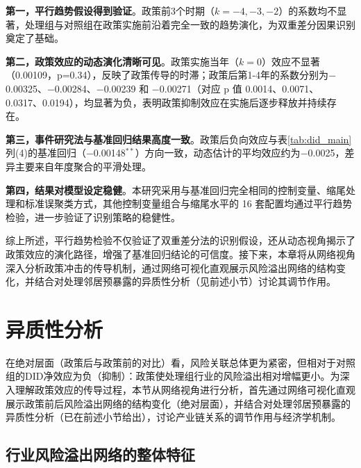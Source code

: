 \textbf{第一，平行趋势假设得到验证}。政策前3个时期（$k=-4,-3,-2$）的系数均不显著，处理组与对照组在政策实施前沿着完全一致的趋势演化，为双重差分因果识别奠定了基础。

\textbf{第二，政策效应的动态演化清晰可见}。政策实施当年（$k=0$）效应不显著（0.00109，p=0.34），反映了政策传导的时滞；政策后第1-4年的系数分别为$-$0.00325、$-$0.00284、$-$0.00239 和 $-$0.00271（对应 p 值 0.0014、0.0071、0.0317、0.0194），均显著为负，表明政策抑制效应在实施后逐步释放并持续存在。

\textbf{第三，事件研究法与基准回归结果高度一致}。政策后负向效应与表\ref{tab:did_main}列(4)的基准回归（$-$0.00148$^{**}$）方向一致，动态估计的平均效应约为$-$0.0025，差异主要来自年度聚合的平滑处理。

\textbf{第四，结果对模型设定稳健}。本研究采用与基准回归完全相同的控制变量、缩尾处理和标准误聚类方式，其他控制变量组合与缩尾水平的 16 套配置均通过平行趋势检验，进一步验证了识别策略的稳健性。

综上所述，平行趋势检验不仅验证了双重差分法的识别假设，还从动态视角揭示了政策效应的演化路径，增强了基准回归结论的可信度。接下来，本章将从网络视角深入分析政策冲击的传导机制，通过网络可视化直观展示风险溢出网络的结构变化，并结合对处理邻居预暴露的异质性分析（见前述小节）讨论其调节作用。



\section{异质性分析}
\label{sec:network_analysis}



在绝对层面（政策后与政策前的对比）看，风险关联总体更为紧密，但相对于对照组的DID净效应为负（抑制）：政策使处理组行业的风险溢出相对增幅更小。为深入理解政策效应的传导过程，本节从网络视角进行分析，首先通过网络可视化直观展示政策前后风险溢出网络的结构变化（绝对层面），并结合对处理邻居预暴露的异质性分析（已在前述小节给出），讨论产业链关系的调节作用与经济学机制。



\subsection{行业风险溢出网络的整体特征}

